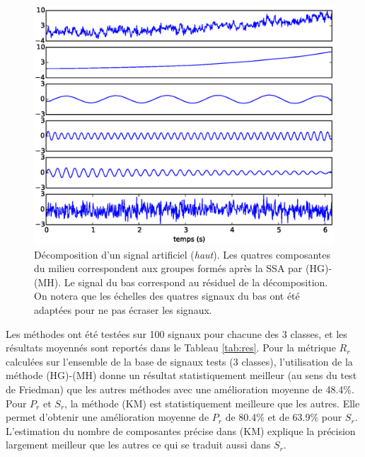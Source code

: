 \documentclass{gretsi}
\begin{document}
    \begin{figure}[tp]
        \centering
        \includegraphics[width=.5\textwidth]{img/artsig3.eps}
        \caption{Décomposition d'un signal artificiel (\emph{haut}). Les quatres composantes du milieu correspondent aux groupes formés après la SSA par (HG)-(MH). Le signal du bas correspond au résiduel de la décomposition. On notera que les échelles des quatres signaux du bas ont été adaptées pour ne pas écraser les signaux.} %
        \label{fig:dec}
    \end{figure}

Les méthodes ont été testées sur 100 signaux pour chacune des 3 classes, et les résultats moyennés sont reportés dans le Tableau \ref{tab:res}.
Pour la métrique $R_r$ calculées sur l'ensemble de la base de signaux tests (3 classes), l'utilisation de la méthode (HG)-(MH) donne un résultat statistiquement meilleur (au sens du test de Friedman) que les autres méthodes avec une amélioration moyenne de 48.4\%.
Pour $P_r$ et $S_r$, la méthode (KM) est statistiquement meilleure que les autres.
Elle permet d'obtenir une amélioration moyenne de $P_r$ de 80.4\% et de 63.9\% pour $S_r$.
L'estimation du nombre de composantes précise dans (KM) explique la précision largement meilleur que les autres ce qui se traduit aussi dans $S_r$.

\end{document}

